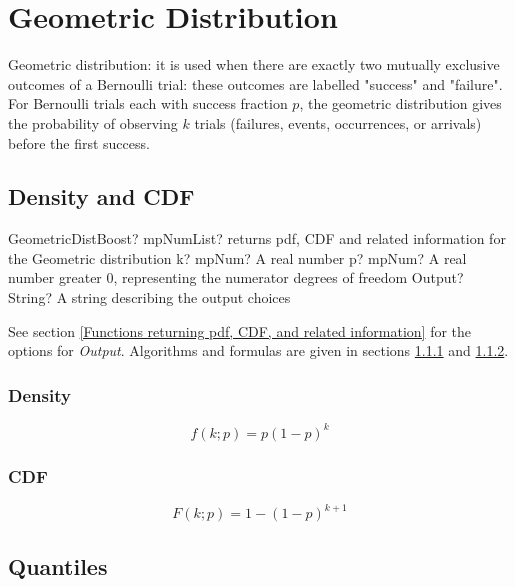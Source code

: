\section{Geometric Distribution}

Geometric distribution: it is used when there are exactly two mutually exclusive outcomes of a Bernoulli trial: these outcomes are labelled "success" and "failure". For Bernoulli trials each with success fraction $p$, the geometric distribution gives the probability of observing $k$ trials (failures, events,
occurrences, or arrivals) before the first success.




\subsection{Density and CDF}

\begin{mpFunctionsExtract}
	\mpFunctionThree
	{GeometricDistBoost? mpNumList? returns pdf, CDF and related information for the Geometric distribution}
	{k? mpNum? A real number}
	{p? mpNum? A real number greater 0, representing the numerator  degrees of freedom}
	{Output? String? A string describing the output choices}
\end{mpFunctionsExtract}


\vspace{0.3cm}
See section \ref{Functions returning pdf, CDF, and related information} for the options for {\itshape\sffamily Output}. Algorithms and formulas are given in sections \ref{GeometricDistributionDensity} and \ref{GeometricDistributionCDF}.


\subsubsection{Density}
\label{GeometricDistributionDensity}

\begin{equation} 
	f(k;p)= p (1-p)^k 
\end{equation}


\subsubsection{CDF}
\label{GeometricDistributionCDF}
\begin{equation} 
	F(k;p)= 1- (1-p)^{k+1} 
\end{equation}

\subsection{Quantiles}

